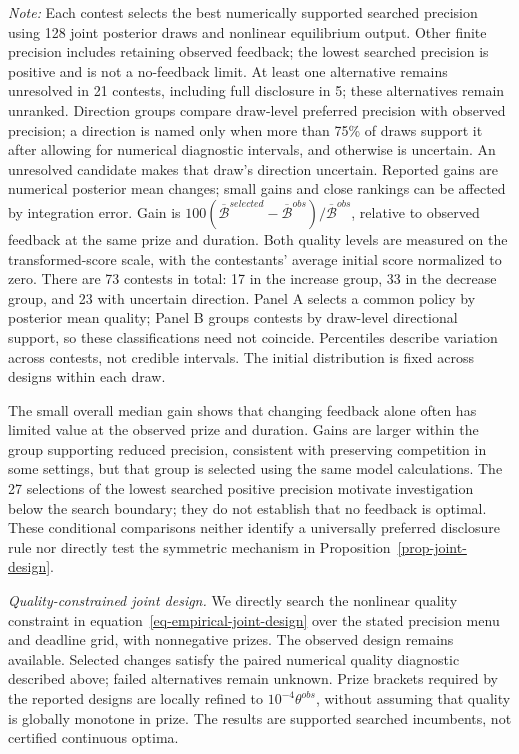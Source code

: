 \begin{table}[!htbp]
\begin{minipage}{\textwidth}
\footnotesize\textit{Note:} Each contest selects the best numerically supported searched precision using 128 joint posterior draws and nonlinear equilibrium output. Other finite precision includes retaining observed feedback; the lowest searched precision is positive and is not a no-feedback limit. At least one alternative remains unresolved in 21 contests, including full disclosure in 5; these alternatives remain unranked. Direction groups compare draw-level preferred precision with observed precision; a direction is named only when more than 75\% of draws support it after allowing for numerical diagnostic intervals, and otherwise is uncertain. An unresolved candidate makes that draw's direction uncertain. Reported gains are numerical posterior mean changes; small gains and close rankings can be affected by integration error. Gain is $100(\overline{\mathcal B}^{selected}-\overline{\mathcal B}^{obs})/\overline{\mathcal B}^{obs}$, relative to observed feedback at the same prize and duration. {Both quality levels are measured on the transformed-score scale, with the contestants’ average initial score normalized to zero.} There are 73 contests in total: 17 in the increase group, 33 in the decrease group, and 23 with uncertain direction. Panel A selects a common policy by posterior mean quality; Panel B groups contests by draw-level directional support, so these classifications need not coincide. Percentiles describe variation across contests, not credible intervals. The initial distribution is fixed across designs within each draw.
\end{minipage}
\end{table}

The small overall median gain shows that changing feedback alone often has limited value at the observed prize and duration. Gains are larger within the group supporting reduced precision, consistent with preserving competition in some settings, but that group is selected using the same model calculations. The 27 selections of the lowest searched positive precision motivate investigation below the search boundary; they do not establish that no feedback is optimal. These conditional comparisons neither identify a universally preferred disclosure rule nor directly test the symmetric mechanism in Proposition~\ref{prop-joint-design}.

\textit{Quality-constrained joint design.} We directly search the nonlinear quality constraint in equation~\eqref{eq-empirical-joint-design} over the stated precision menu and deadline grid, with nonnegative prizes. The observed design remains available. Selected changes satisfy the paired numerical quality diagnostic described above; failed alternatives remain unknown. Prize brackets required by the reported designs are locally refined to $10^{-4}\theta^{obs}$, without assuming that quality is globally monotone in prize. The results are supported searched incumbents, not certified continuous optima.

